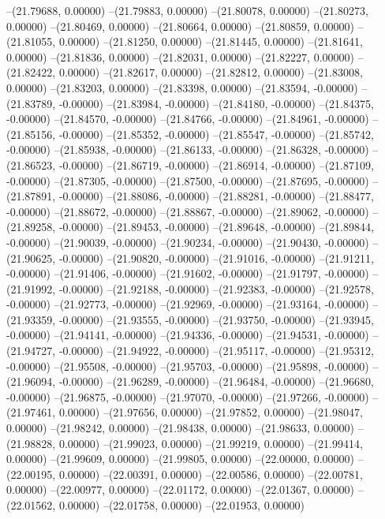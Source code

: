 --(21.79688, 0.00000)
--(21.79883, 0.00000)
--(21.80078, 0.00000)
--(21.80273, 0.00000)
--(21.80469, 0.00000)
--(21.80664, 0.00000)
--(21.80859, 0.00000)
--(21.81055, 0.00000)
--(21.81250, 0.00000)
--(21.81445, 0.00000)
--(21.81641, 0.00000)
--(21.81836, 0.00000)
--(21.82031, 0.00000)
--(21.82227, 0.00000)
--(21.82422, 0.00000)
--(21.82617, 0.00000)
--(21.82812, 0.00000)
--(21.83008, 0.00000)
--(21.83203, 0.00000)
--(21.83398, 0.00000)
--(21.83594, -0.00000)
--(21.83789, -0.00000)
--(21.83984, -0.00000)
--(21.84180, -0.00000)
--(21.84375, -0.00000)
--(21.84570, -0.00000)
--(21.84766, -0.00000)
--(21.84961, -0.00000)
--(21.85156, -0.00000)
--(21.85352, -0.00000)
--(21.85547, -0.00000)
--(21.85742, -0.00000)
--(21.85938, -0.00000)
--(21.86133, -0.00000)
--(21.86328, -0.00000)
--(21.86523, -0.00000)
--(21.86719, -0.00000)
--(21.86914, -0.00000)
--(21.87109, -0.00000)
--(21.87305, -0.00000)
--(21.87500, -0.00000)
--(21.87695, -0.00000)
--(21.87891, -0.00000)
--(21.88086, -0.00000)
--(21.88281, -0.00000)
--(21.88477, -0.00000)
--(21.88672, -0.00000)
--(21.88867, -0.00000)
--(21.89062, -0.00000)
--(21.89258, -0.00000)
--(21.89453, -0.00000)
--(21.89648, -0.00000)
--(21.89844, -0.00000)
--(21.90039, -0.00000)
--(21.90234, -0.00000)
--(21.90430, -0.00000)
--(21.90625, -0.00000)
--(21.90820, -0.00000)
--(21.91016, -0.00000)
--(21.91211, -0.00000)
--(21.91406, -0.00000)
--(21.91602, -0.00000)
--(21.91797, -0.00000)
--(21.91992, -0.00000)
--(21.92188, -0.00000)
--(21.92383, -0.00000)
--(21.92578, -0.00000)
--(21.92773, -0.00000)
--(21.92969, -0.00000)
--(21.93164, -0.00000)
--(21.93359, -0.00000)
--(21.93555, -0.00000)
--(21.93750, -0.00000)
--(21.93945, -0.00000)
--(21.94141, -0.00000)
--(21.94336, -0.00000)
--(21.94531, -0.00000)
--(21.94727, -0.00000)
--(21.94922, -0.00000)
--(21.95117, -0.00000)
--(21.95312, -0.00000)
--(21.95508, -0.00000)
--(21.95703, -0.00000)
--(21.95898, -0.00000)
--(21.96094, -0.00000)
--(21.96289, -0.00000)
--(21.96484, -0.00000)
--(21.96680, -0.00000)
--(21.96875, -0.00000)
--(21.97070, -0.00000)
--(21.97266, -0.00000)
--(21.97461, 0.00000)
--(21.97656, 0.00000)
--(21.97852, 0.00000)
--(21.98047, 0.00000)
--(21.98242, 0.00000)
--(21.98438, 0.00000)
--(21.98633, 0.00000)
--(21.98828, 0.00000)
--(21.99023, 0.00000)
--(21.99219, 0.00000)
--(21.99414, 0.00000)
--(21.99609, 0.00000)
--(21.99805, 0.00000)
--(22.00000, 0.00000)
--(22.00195, 0.00000)
--(22.00391, 0.00000)
--(22.00586, 0.00000)
--(22.00781, 0.00000)
--(22.00977, 0.00000)
--(22.01172, 0.00000)
--(22.01367, 0.00000)
--(22.01562, 0.00000)
--(22.01758, 0.00000)
--(22.01953, 0.00000)
